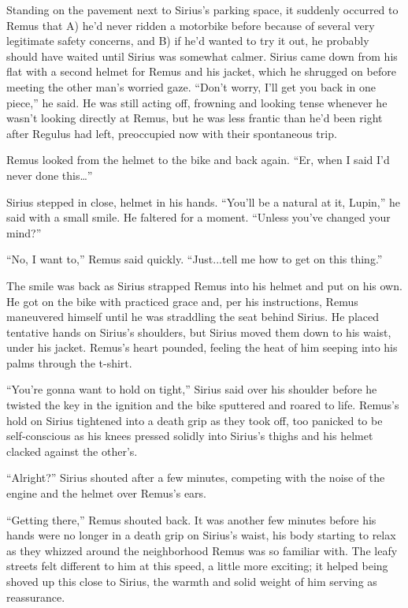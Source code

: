 Standing on the pavement next to Sirius’s parking space, it suddenly occurred to Remus that A) he’d never ridden a motorbike before because of several very legitimate safety concerns, and B) if he’d wanted to try it out, he probably should have waited until Sirius was somewhat calmer. Sirius came down from his flat with a second helmet for Remus and his jacket, which he shrugged on before meeting the other man’s worried gaze. “Don’t worry, I’ll get you back in one piece,” he said. He was still acting off, frowning and looking tense whenever he wasn’t looking directly at Remus, but he was less frantic than he’d been right after Regulus had left, preoccupied now with their spontaneous trip.

Remus looked from the helmet to the bike and back again. “Er, when I said I’d never done this…”

Sirius stepped in close, helmet in his hands. “You’ll be a natural at it, Lupin,” he said with a small smile. He faltered for a moment. “Unless you’ve changed your mind?”

“No, I want to,” Remus said quickly. “Just...tell me how to get on this thing.”

The smile was back as Sirius strapped Remus into his helmet and put on his own. He got on the bike with practiced grace and, per his instructions, Remus maneuvered himself until he was straddling the seat behind Sirius. He placed tentative hands on Sirius’s shoulders, but Sirius moved them down to his waist, under his jacket. Remus’s heart pounded, feeling the heat of him seeping into his palms through the t-shirt.

“You’re gonna want to hold on tight,” Sirius said over his shoulder before he twisted the key in the ignition and the bike sputtered and roared to life. Remus’s hold on Sirius tightened into a death grip as they took off, too panicked to be self-conscious as his knees pressed solidly into Sirius’s thighs and his helmet clacked against the other’s.

“Alright?” Sirius shouted after a few minutes, competing with the noise of the engine and the helmet over Remus’s ears.

“Getting there,” Remus shouted back. It was another few minutes before his hands were no longer in a death grip on Sirius’s waist, his body starting to relax as they whizzed around the neighborhood Remus was so familiar with. The leafy streets felt different to him at this speed, a little more exciting; it helped being shoved up this close to Sirius, the warmth and solid weight of him serving as reassurance.

